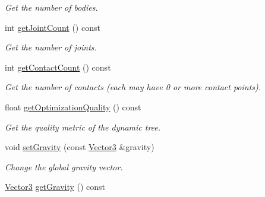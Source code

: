 \begin{DoxyCompactItemize}
\begin{DoxyCompactList}\small\item\em Get the number of bodies. \end{DoxyCompactList}\item 
int \hyperlink{class_magnum_1_1_physics3_1_1_world_ad8c5ea8131526b040e2bd167747761a8}{get\+Joint\+Count} () const \hypertarget{class_magnum_1_1_physics3_1_1_world_ad8c5ea8131526b040e2bd167747761a8}{}\label{class_magnum_1_1_physics3_1_1_world_ad8c5ea8131526b040e2bd167747761a8}

\begin{DoxyCompactList}\small\item\em Get the number of joints. \end{DoxyCompactList}\item 
int \hyperlink{class_magnum_1_1_physics3_1_1_world_a58e1f8dc1f9aa610c83e5e39db2bc3d1}{get\+Contact\+Count} () const \hypertarget{class_magnum_1_1_physics3_1_1_world_a58e1f8dc1f9aa610c83e5e39db2bc3d1}{}\label{class_magnum_1_1_physics3_1_1_world_a58e1f8dc1f9aa610c83e5e39db2bc3d1}

\begin{DoxyCompactList}\small\item\em Get the number of contacts (each may have 0 or more contact points). \end{DoxyCompactList}\item 
float \hyperlink{class_magnum_1_1_physics3_1_1_world_ac0cb0202bd388d2d2e32425300f72067}{get\+Optimization\+Quality} () const 
\begin{DoxyCompactList}\small\item\em Get the quality metric of the dynamic tree. \end{DoxyCompactList}\item 
void \hyperlink{class_magnum_1_1_physics3_1_1_world_afe2d44b456f0fe71a4287c1bd6030cde}{set\+Gravity} (const \hyperlink{class_magnum_1_1_vector3}{Vector3} \&gravity)\hypertarget{class_magnum_1_1_physics3_1_1_world_afe2d44b456f0fe71a4287c1bd6030cde}{}\label{class_magnum_1_1_physics3_1_1_world_afe2d44b456f0fe71a4287c1bd6030cde}

\begin{DoxyCompactList}\small\item\em Change the global gravity vector. \end{DoxyCompactList}\item 
\hyperlink{class_magnum_1_1_vector3}{Vector3} \hyperlink{class_magnum_1_1_physics3_1_1_world_ae8d4141a1a7606c3135375dfea5b55e3}{get\+Gravity} () const \hypertarget{class_magnum_1_1_physics3_1_1_world_ae8d4141a1a7606c3135375dfea5b55e3}{}\label{class_magnum_1_1_physics3_1_1_world_ae8d4141a1a7606c3135375dfea5b55e3}


\end{DoxyCompactItemize}
